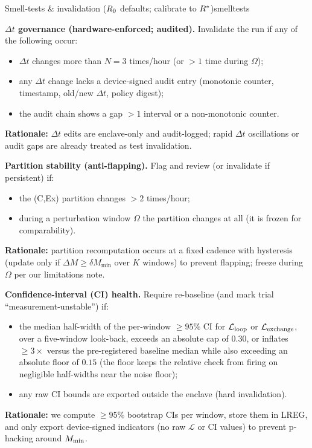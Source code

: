 \documentclass[11pt]{article}
\begin{document}
\begin{docbox}{Smell-tests \& invalidation ($R_0$ defaults; calibrate to $R^*$)}{smelltests}

\textbf{$\Delta t$ governance (hardware-enforced; audited).} Invalidate the run if any of the following occur:
\begin{itemize}
\item $\Delta t$ changes more than $N = 3$ times/hour (or $>1$ time during $\Omega$);
\item any $\Delta t$ change lacks a device-signed audit entry (monotonic counter, timestamp, old/new $\Delta t$, policy digest);
\item the audit chain shows a gap $>1$ interval or a non-monotonic counter.
\end{itemize}
\textbf{Rationale:} $\Delta t$ edits are enclave-only and audit-logged; rapid $\Delta t$ oscillations or audit gaps are already treated as test invalidation.

\textbf{Partition stability (anti-flapping).} Flag and review (or invalidate if persistent) if:
\begin{itemize}
\item the (C,Ex) partition changes $>2$ times/hour;
\item during a perturbation window $\Omega$ the partition changes at all (it is frozen for comparability).
\end{itemize}
\textbf{Rationale:} partition recomputation occurs at a fixed cadence with hysteresis (update only if $\Delta M \geq \delta M_{\min}$ over $K$ windows) to prevent flapping; freeze during $\Omega$ per our limitations note.

\textbf{Confidence-interval (CI) health.} Require re-baseline (and mark trial ``measurement-unstable'') if:
\begin{itemize}
\item the median half-width of the per-window $\geq 95\%$ CI for $\mathcal{L}_{\text{loop}}$ or $\mathcal{L}_{\text{exchange}}$, over a five-window look-back, exceeds an absolute cap of $0.30$, or inflates $\geq 3\times$ versus the pre-registered baseline median while also exceeding an absolute floor of $0.15$ (the floor keeps the relative check from firing on negligible half-widths near the noise floor);
\item any raw CI bounds are exported outside the enclave (hard invalidation).
\end{itemize}
\textbf{Rationale:} we compute $\geq 95\%$ bootstrap CIs per window, store them in LREG, and only export device-signed indicators (no raw $\mathcal{L}$ or CI values) to prevent p-hacking around $M_{\min}$.


\end{docbox}
\end{document}
